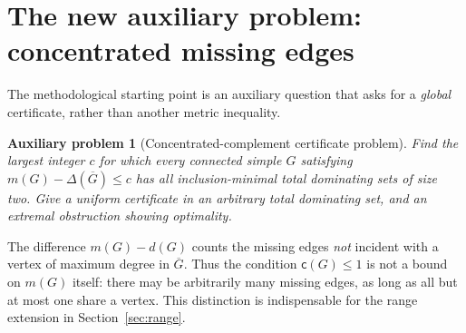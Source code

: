 \documentclass[11pt,a4paper]{article}
\newtheorem{problem}[theorem]{Auxiliary problem}
\theoremstyle{definition}\newtheorem{definition}[theorem]{Definition}
\theoremstyle{remark}\newtheorem{remark}[theorem]{Remark}
\newcommand{\Gbar}{\overline G}
\newcommand{\compdef}{\mathsf c}
\begin{document}
\section{The new auxiliary problem: concentrated missing edges}
The methodological starting point is an auxiliary question that asks for a \emph{global} certificate, rather than another metric inequality.

\begin{problem}[Concentrated-complement certificate problem]\label{prob:aux}
Find the largest integer $c$ for which every connected simple $G$ satisfying $m(G)-\Delta(\Gbar)\le c$ has all inclusion-minimal total dominating sets of size two. Give a uniform certificate in an arbitrary total dominating set, and an extremal obstruction showing optimality.
\end{problem}

The difference $m(G)-d(G)$ counts the missing edges \emph{not} incident with a vertex of maximum degree in $\Gbar$. Thus the condition $\compdef(G)\le1$ is not a bound on $m(G)$ itself: there may be arbitrarily many missing edges, as long as all but at most one share a vertex. This distinction is indispensable for the range extension in Section~\ref{sec:range}.
\end{document}
